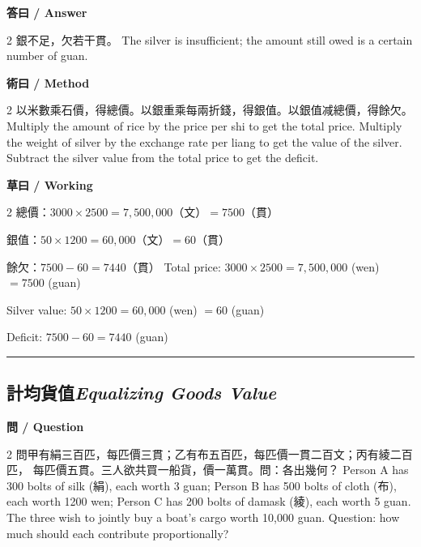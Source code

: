 \documentclass[11pt,a4paper]{article}
\newcommand{\bilingualsubsection}[2]{\subsection{#1\quad\textit{#2}}}
\newcommand{\longline}{\noindent\rule{\textwidth}{0.4pt}}
\begin{document}
\vspace{0.4em}
\noindent\textbf{\textcolor{chinesecolor}{答曰} / \textcolor{englishcolor}{Answer}}
\vspace{0.2em}
\begin{paracol}{2}
銀不足，欠若干貫。
\switchcolumn
The silver is insufficient; the amount still owed is a certain number of guan.
\end{paracol}

\vspace{0.4em}
\noindent\textbf{\textcolor{chinesecolor}{術曰} / \textcolor{englishcolor}{Method}}
\vspace{0.2em}
\begin{paracol}{2}
以米數乘石價，得總價。以銀重乘每兩折錢，得銀值。以銀值减總價，得餘欠。
\switchcolumn
Multiply the amount of rice by the price per shi to get the total price.
Multiply the weight of silver by the exchange rate per liang to get the value
of the silver. Subtract the silver value from the total price to get the deficit.
\end{paracol}

\vspace{0.4em}
\noindent\textbf{\textcolor{chinesecolor}{草曰} / \textcolor{englishcolor}{Working}}
\vspace{0.2em}
\begin{paracol}{2}
總價：$3000 \times 2500 = 7{,}500{,}000$（文）$= 7500$（貫）

銀值：$50 \times 1200 = 60{,}000$（文）$= 60$（貫）

餘欠：$7500 - 60 = 7440$（貫）
\switchcolumn
Total price: $3000 \times 2500 = 7{,}500{,}000$ (wen) $= 7500$ (guan)

Silver value: $50 \times 1200 = 60{,}000$ (wen) $= 60$ (guan)

Deficit: $7500 - 60 = 7440$ (guan)
\end{paracol}

\vspace{0.5em}
\longline

\bilingualsubsection{計均貨值}{Equalizing Goods Value}

\vspace{0.4em}
\noindent\textbf{\textcolor{chinesecolor}{問} / \textcolor{englishcolor}{Question}}
\vspace{0.3em}
\begin{paracol}{2}
問甲有絹三百匹，每匹價三貫；乙有布五百匹，每匹價一貫二百文；丙有綾二百匹，
每匹價五貫。三人欲共買一船貨，價一萬貫。問：各出幾何？
\switchcolumn
Person A has 300 bolts of silk (絹), each worth 3 guan; Person B has 500 bolts
of cloth (布), each worth 1200 wen; Person C has 200 bolts of damask (綾),
each worth 5 guan. The three wish to jointly buy a boat's cargo worth
10{,}000 guan. Question: how much should each contribute proportionally?
\end{paracol}
\end{document}
